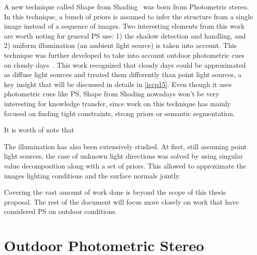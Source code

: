 \documentclass{report}
\begin{document}
A new technique called Shape from Shading~\cite{Horn1989} was born from Photometric stereo. In this technique, a bunch of priors is assumed to infer the structure from a single image instead of a sequence of images. Two interesting elements from this work are worth noting for general PS use: 1) the shadow detection and handling, and 2) uniform illumination (an ambient light source) is taken into account. This technique was further developed to take into account outdoor photometric cues on cloudy days~\cite{Langer1994}. This work recognized that cloudy days could be approximated as diffuse light sources and treated them differently than point light sources, a key insight that will be discussed in details in \ref{iccp15}. Even though it uses photometric cues like PS, Shape from Shading nowadays won't be very interesting for knowledge transfer, since work on this technique has mainly focused on finding tight constraints, strong priors or semantic segmentation.

\cite{HernandezEsteban2008}


It is worth of note that

\cite{BarskyPetrou-pami-2003,ikehata-cvpr-12,ikehata-cvpr-14}

The illumination has also been extensively studied. At first, still assuming point light sources, the case of unknown light directions was solved \cite{Hayakawa1994} by using singular value decomposition along with a set of priors. This allowed to approximate the images lighting conditions and the surface normals jointly.

\cite{spence-iwtas-03,drbohlav-iccv-05}

\cite{Angelopoulou2013}



Covering the vast amount of work done is beyond the scope of this thesis proposal. The rest of the document will focus more closely on work that have considered PS on outdoor conditions.
\cite{basri-ijcv-2007}

\section{Outdoor Photometric Stereo}
\end{document}
